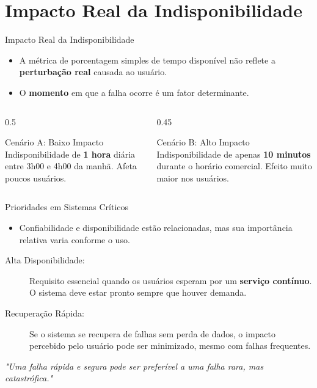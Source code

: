 \documentclass[9pt]{beamer}
\begin{document}
\section{Impacto Real da Indisponibilidade}  

\begin{frame}{Impacto Real da Indisponibilidade}
    \begin{itemize}
        \item A métrica de porcentagem simples de tempo disponível não reflete a \textbf{perturbação real} causada ao usuário.
        \item O \textbf{momento} em que a falha ocorre é um fator determinante.
    \end{itemize}

    \begin{columns}[T]
        \begin{column}{0.5\textwidth}
            \begin{exampleblock}{Cenário A: Baixo Impacto}
                Indisponibilidade de \textbf{1 hora} diária entre 3h00 e 4h00 da manhã. Afeta poucos usuários.
            \end{exampleblock}
        \end{column}
        \begin{column}{0.45\textwidth}
            \begin{alertblock}{Cenário B: Alto Impacto}
                Indisponibilidade de apenas \textbf{10 minutos} durante o horário comercial. Efeito muito maior nos usuários.
            \end{alertblock}
        \end{column}
    \end{columns}
\end{frame}

\begin{frame}{Prioridades em Sistemas Críticos}
    \begin{itemize}
        \item Confiabilidade e disponibilidade estão relacionadas, mas sua importância relativa varia conforme o uso.
    \end{itemize}

    \begin{description}
        \item[Alta Disponibilidade:] Requisito essencial quando os usuários esperam por um \textbf{serviço contínuo}. O sistema deve estar pronto sempre que houver demanda.
        \item[Recuperação Rápida:] Se o sistema se recupera de falhas sem perda de dados, o impacto percebido pelo usuário pode ser minimizado, mesmo com falhas frequentes.
    \end{description}

    \begin{center}
        \textit{"Uma falha rápida e segura pode ser preferível a uma falha rara, mas catastrófica."}
    \end{center}
\end{frame}
\end{document}
